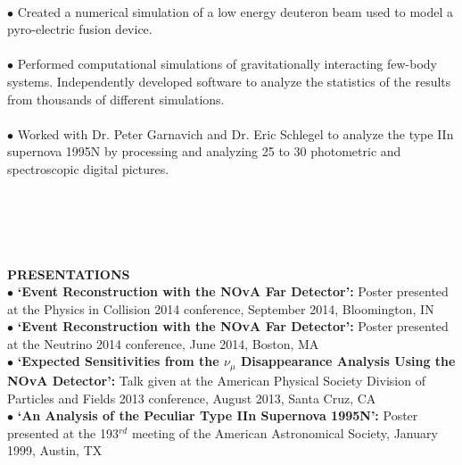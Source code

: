 \documentclass[10pt]{article} %
\begin{document}
\\
%
$\bullet$ Created a numerical simulation of a low energy deuteron beam used to model a pyro-electric fusion device.
\\
%
\\
%
$\bullet$ Performed computational simulations of gravitationally interacting few-body systems. Independently developed software to analyze the statistics of the results from thousands of different simulations.
\\
%
\\
%
$\bullet$ Worked with Dr. Peter Garnavich and Dr. Eric Schlegel to analyze the type IIn supernova 1995N by processing and analyzing 25 to 30 photometric and spectroscopic digital pictures.
\\
%
%
%
%
\\
\\
\\
\\
\medskip \\
{\bf PRESENTATIONS~~\hrulefill }
\medskip \\
$\bullet$ {\bf `Event Reconstruction with the NOvA Far Detector':}
  Poster presented at the Physics in Collision 2014 conference, September 2014, Bloomington, IN \\
%
$\bullet$ {\bf `Event Reconstruction with the NOvA Far Detector':}
  Poster presented at the Neutrino 2014 conference, June 2014, Boston, MA \\
%
$\bullet$ {\bf `Expected Sensitivities from the $\nu_{\mu}$ Disappearance Analysis Using the NOvA Detector':}
  Talk given at the American Physical Society Division of Particles and Fields 2013 conference, August 2013, Santa Cruz, CA \\
%
$\bullet$ {\bf `An Analysis of the Peculiar Type IIn Supernova 1995N':}
  Poster presented at the 193$^{rd}$ meeting of the American Astronomical Society, January 1999, Austin, TX
%
%
\end{document}

